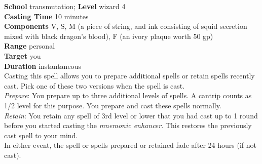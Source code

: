 \textbf{School} transmutation; \textbf{Level }wizard 4\\
\textbf{Casting Time} 10 minutes\\
\textbf{Components} V, S, M (a piece of string, and ink consisting of squid secretion mixed with black dragon's blood), F (an ivory plaque worth 50 gp)\\
\textbf{Range} personal\\
\textbf{Target} you\\
\textbf{Duration} instantaneous\\
Casting this spell allows you to prepare additional spells or retain spells recently cast. Pick one of these two versions when the spell is cast.\\
\textit{Prepare}: You prepare up to three additional levels of spells. A cantrip counts as 1/2 level for this purpose. You prepare and cast these spells normally.\\
\textit{Retain}: You retain any spell of 3rd level or lower that you had cast up to 1 round before you started casting the \textit{mnemonic enhancer}. This restores the previously cast spell to your mind.\\
In either event, the spell or spells prepared or retained fade after 24 hours (if not cast).\\
